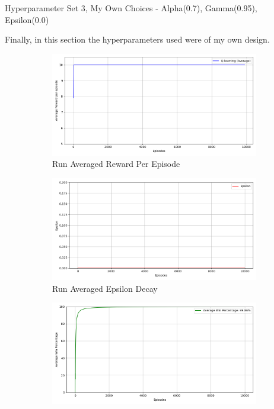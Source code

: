 \documentclass[a4paper,9pt]{scrartcl}
\makeatletter
\renewcommand{\section}{\@startsection{section}{1}{0mm}
  {1.5\baselineskip}
  {1\baselineskip} 
  {\normalfont\Large\bfseries}}
\makeatother
\begin{document}
\section{Hyperparameter Set 3, My Own Choices - Alpha(0.7), Gamma(0.95), Epsilon(0.0)}

Finally, in this section the hyperparameters used were of my own design.




\begin{figure}[H]
\centering
\begin{subfigure}[b]{0.32\textwidth}
\includegraphics[width=\textwidth]{images/q_learning_rewards_avg(3).png}
\caption{Run Averaged Reward Per Episode}
\label{fig:rewards_avg}
\end{subfigure}
\hfill
\begin{subfigure}[b]{0.32\textwidth}
\includegraphics[width=\textwidth]{images/q_learning_epsilon_avg(3).png}
\caption{Run Averaged Epsilon Decay}
\label{fig:epsilon_avg}
\end{subfigure}
\hfill
\begin{subfigure}[b]{0.32\textwidth}
\includegraphics[width=\textwidth]{images/q_learning_win_percentage_avg(3).png}

\end{subfigure}
\end{figure}
\end{document}
